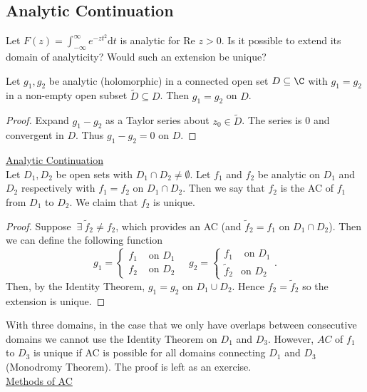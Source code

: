 \documentclass[a4paper]{article}
\begin{document}
\subsection{Analytic Continuation}
    Let $F(z)= \int_{-\infty}^{\infty} e^{ - z t^2} \text{d}t$ is analytic for $\text{Re } z > 0$. Is it possible to extend its domain of analyticity? Would such an extension be unique?
\begin{thm}
    Let $g_1, g_2$ be analytic (holomorphic) in a connected open set $D \subseteq \C$ with $g_1 = g_2$ in a non-empty open subset $\tilde{D} \subseteq D$. Then $g_1 = g_2$ on $D$.
\end{thm}
\begin{proof}
Expand $g_1 - g_2$ as a Taylor series about $z_0 \in \tilde{D}$. The series is 0 and convergent in $D$. Thus  $g_1 - g_2 = 0$ on $D$.
\end{proof}
\underline{Analytic Continuation} \\
Let $D_1, D_2$ be open sets with $D_1 \cap D_2 \ne \emptyset$. Let $f_1$ and $f_2$ be analytic on $D_1$ and $D_2$ respectively with $f_1 = f_2$ on $D_1 \cap D_2$. Then we say that $f_2$ is the AC of $f_1$ from $D_1$ to $D_2$. We claim that $f_2 $ is unique.
\begin{proof}
    Suppose $\ \exists \  \tilde{f}_2 \ne f_2$, which provides an AC (and $\tilde{f}_2 = f_1$ on $D_1 \cap D_2$). Then we can define the following function
    \[
    g_1 = \begin{cases}
        f_1 & \text{ on } D_1 \\
        f_2 & \text{ on } D_2
    \end{cases}
     \quad g_2= \begin{cases}
         f_1 & \text{ on }D_1 \\
         \tilde{f}_2 & \text{on }D_2
     \end{cases}
    .\] 
    Then, by the Identity Theorem, $g_1= g_2$ on $D_1 \cup D_2$. Hence $f_2 = \tilde{f}_2$ so the extension is unique.
\end{proof}
With three domains, in the case that we only have overlaps between consecutive domains we cannot use the Identity Theorem on $D_1$ and $D_3$. However, $AC$ of $f_1$ to $D_3$ is unique if AC is possible for all domains connecting $D_1$ and $D_3$ (Monodromy Theorem). The proof is left as an exercise.\\
\underline{Methods of AC}
\end{document}
